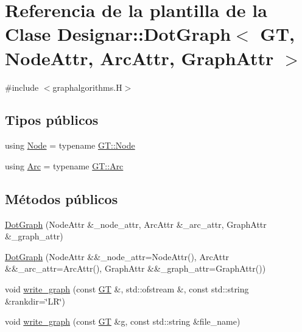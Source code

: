 \hypertarget{class_designar_1_1_dot_graph}{}\section{Referencia de la plantilla de la Clase Designar\+:\+:Dot\+Graph$<$ GT, Node\+Attr, Arc\+Attr, Graph\+Attr $>$}
\label{class_designar_1_1_dot_graph}


{\ttfamily \#include $<$graphalgorithms.\+H$>$}

\subsection*{Tipos públicos}
\begin{DoxyCompactItemize}
\item 
using \hyperlink{class_designar_1_1_dot_graph_a591d14a84a622be5bdcc190543c8ca46}{Node} = typename \hyperlink{class_designar_1_1_graph_a5dfc7dba9d092ac489c72e40390c37d0}{G\+T\+::\+Node}
\item 
using \hyperlink{class_designar_1_1_dot_graph_a72979d4373928269dc67fb369548701d}{Arc} = typename \hyperlink{class_designar_1_1_graph_a74c730ef4ce2d20f998d72bd25c2b5bf}{G\+T\+::\+Arc}
\end{DoxyCompactItemize}
\subsection*{Métodos públicos}
\begin{DoxyCompactItemize}
\item 
\hyperlink{class_designar_1_1_dot_graph_a6173edee577a1311c20f6d6bba5e2673}{Dot\+Graph} (Node\+Attr \&\+\_\+node\+\_\+attr, Arc\+Attr \&\+\_\+arc\+\_\+attr, Graph\+Attr \&\+\_\+graph\+\_\+attr)
\item 
\hyperlink{class_designar_1_1_dot_graph_a73a8e33201f40c6a3085eda7a573af6f}{Dot\+Graph} (Node\+Attr \&\&\+\_\+node\+\_\+attr=Node\+Attr(), Arc\+Attr \&\&\+\_\+arc\+\_\+attr=Arc\+Attr(), Graph\+Attr \&\&\+\_\+graph\+\_\+attr=Graph\+Attr())
\item 
void \hyperlink{class_designar_1_1_dot_graph_afa9f692e6ec45dba1cd8e9ebf830f212}{write\+\_\+graph} (const \hyperlink{demo-buildgraph_8_c_a3001c40d2c31ca87ed96cd7d1334a55e}{GT} \&, std\+::ofstream \&, const std\+::string \&rankdir=\char`\"{}LR\char`\"{})
\item 
void \hyperlink{class_designar_1_1_dot_graph_a6f2b98b76d2c970ad875a59388f693cb}{write\+\_\+graph} (const \hyperlink{demo-buildgraph_8_c_a3001c40d2c31ca87ed96cd7d1334a55e}{GT} \&g, const std\+::string \&file\+\_\+name)
\end{DoxyCompactItemize}


